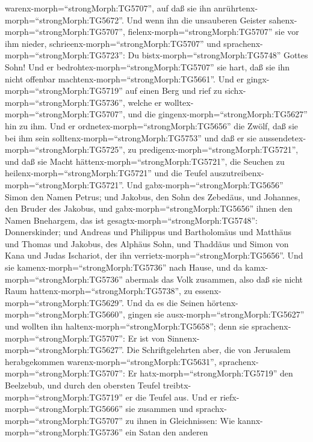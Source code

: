 warenx-morph=``strongMorph:TG5707'', auf daß sie ihn
anrührtenx-morph=``strongMorph:TG5672''.  Und wenn ihn die
unsauberen Geister sahenx-morph=``strongMorph:TG5707'',
fielenx-morph=``strongMorph:TG5707'' sie vor ihm nieder,
schrieenx-morph=``strongMorph:TG5707'' und
sprachenx-morph=``strongMorph:TG5723'': Du
bistx-morph=``strongMorph:TG5748'' Gottes Sohn!  Und er
bedrohtex-morph=``strongMorph:TG5707'' sie hart, daß sie ihn nicht
offenbar machtenx-morph=``strongMorph:TG5661''.  Und er
gingx-morph=``strongMorph:TG5719'' auf einen Berg und rief zu
sichx-morph=``strongMorph:TG5736'', welche er
wolltex-morph=``strongMorph:TG5707'', und die
gingenx-morph=``strongMorph:TG5627'' hin zu ihm.  Und er
ordnetex-morph=``strongMorph:TG5656'' die Zwölf, daß sie bei ihm sein
solltenx-morph=``strongMorph:TG5753'' und daß er sie
aussendetex-morph=``strongMorph:TG5725'', zu
predigenx-morph=``strongMorph:TG5721'',  und daß sie Macht
hättenx-morph=``strongMorph:TG5721'', die Seuchen zu
heilenx-morph=``strongMorph:TG5721'' und die Teufel
auszutreibenx-morph=``strongMorph:TG5721''.  Und
gabx-morph=``strongMorph:TG5656'' Simon den Namen Petrus; 
und Jakobus, den Sohn des Zebedäus, und Johannes, den Bruder des
Jakobus, und gabx-morph=``strongMorph:TG5656'' ihnen den Namen
Bnehargem, das ist gesagtx-morph=``strongMorph:TG5748'': Donnerskinder;
 und Andreas und Philippus und Bartholomäus und Matthäus
und Thomas und Jakobus, des Alphäus Sohn, und Thaddäus und Simon von
Kana  und Judas Ischariot, der ihn
verrietx-morph=``strongMorph:TG5656''.  Und sie
kamenx-morph=``strongMorph:TG5736'' nach Hause, und da
kamx-morph=``strongMorph:TG5736'' abermals das Volk zusammen, also daß
sie nicht Raum hattenx-morph=``strongMorph:TG5738'', zu
essenx-morph=``strongMorph:TG5629''.  Und da es die Seinen
hörtenx-morph=``strongMorph:TG5660'', gingen sie
ausx-morph=``strongMorph:TG5627'' und wollten ihn
haltenx-morph=``strongMorph:TG5658''; denn sie
sprachenx-morph=``strongMorph:TG5707'': Er ist von
Sinnenx-morph=``strongMorph:TG5627''.  Die Schriftgelehrten
aber, die von Jerusalem herabgekommen
warenx-morph=``strongMorph:TG5631'',
sprachenx-morph=``strongMorph:TG5707'': Er
hatx-morph=``strongMorph:TG5719'' den Beelzebub, und durch den obersten
Teufel treibtx-morph=``strongMorph:TG5719'' er die Teufel aus.
 Und er riefx-morph=``strongMorph:TG5666'' sie zusammen und
sprachx-morph=``strongMorph:TG5707'' zu ihnen in Gleichnissen: Wie
kannx-morph=``strongMorph:TG5736'' ein Satan den anderen
